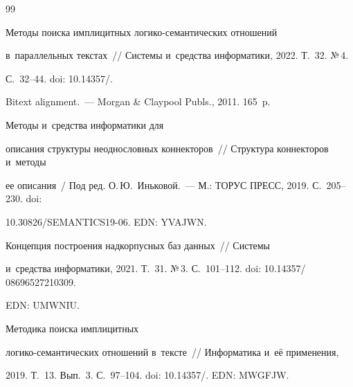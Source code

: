 {\small\frenchspacing


{%




\begin{thebibliography}{99}




 Методы поиска имплицитных ло\-ги\-ко-се\-ман\-ти\-че\-ских отношений 


в~параллельных текс\-тах~/\!\!/ Сис\-те\-мы и~средства информатики, 2022. Т.~32. №\,4.  


С.~32--44. doi: 10.14357\!/.







 Bitext alignment.~--- Morgan \& Claypool Publs., 2011. 165~p.




 Методы и~средства информатики для 


описания структуры неоднословных коннекторов~/\!\!/ Структура коннекторов и~методы 


ее описания~/ Под ред. О.\,Ю.~Иньковой.~--- М.: ТОРУС ПРЕСС, 2019. С.~205--230. doi: 


10.30826\!/\!SEMANTICS19-06. EDN: YVAJWN.







 Концепция построения надкорпусных баз данных~/\!\!/ Сис\-те\-мы 


и~средства информатики, 2021. Т.~31. №\,3. С.~101--112. doi: 10.14357\!/ 08696527210309. 


EDN: UMWNIU.







 Методика поиска имплицитных  


ло\-ги\-ко-се\-ман\-ти\-че\-ских отношений в~тексте~/\!\!/ Информатика и~её применения, 


2019. Т.~13. Вып.~3. С.~97--104. doi: 10.14357\!/. EDN: MWGFJW.








\end{thebibliography}}}
